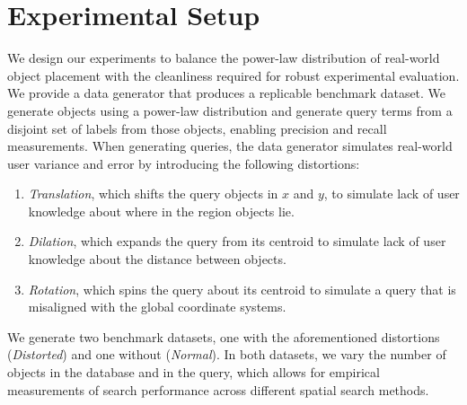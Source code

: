 \section{Experimental Setup}
\label{section:experimental_setup}


\par{
    We design our experiments to balance the power-law distribution of real-world object placement with the cleanliness required for robust experimental evaluation. 
%
    We provide a data generator that produces a replicable benchmark dataset.
    We generate objects using a power-law distribution and generate query terms from a disjoint set of labels from those objects, enabling precision and recall measurements.
%
    When generating queries, the data generator simulates real-world user variance and error by introducing the following distortions:
    \begin{enumerate}
        \item \textit{Translation}, which shifts the query objects in $x$ and $y$, to simulate lack of user knowledge about where in the region objects lie.
        \item \textit{Dilation}, which expands the query from its centroid to simulate lack of user knowledge about the distance between objects.
        \item \textit{Rotation}, which spins the query about its centroid to simulate a query that is misaligned with the global coordinate systems.
    \end{enumerate}
    }
\par{
    We generate two benchmark datasets, one with the aforementioned distortions (\textit{Distorted}) and one without (\textit{Normal}). 
    In both datasets, we vary the number of objects in the database and in the query, which allows for empirical measurements of search performance across different spatial search methods.
}


